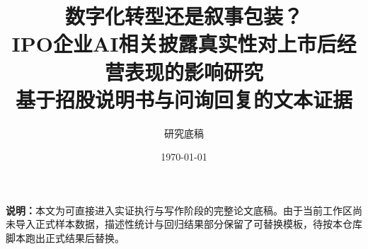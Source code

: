 \documentclass[12pt,a4paper]{ctexart}
\title{数字化转型还是叙事包装？\\IPO企业AI相关披露真实性对上市后经营表现的影响研究\\基于招股说明书与问询回复的文本证据}
\author{研究底稿}
\date{\today}
\begin{document}
\maketitle

\begin{center}
\parbox{0.92\textwidth}{
\small
\textbf{说明：}本文为可直接进入实证执行与写作阶段的完整论文底稿。由于当前工作区尚未导入正式样本数据，描述性统计与回归结果部分保留了可替换模板，待按本仓库脚本跑出正式结果后替换。
}
\end{center}







\appendix




\end{document}
